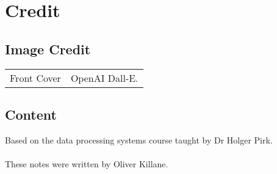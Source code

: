 \chapter{Credit}
\section*{Image Credit}
\begin{center}
	\begin{tabular}{r p{}}
        Front Cover & OpenAI Dall-E. \\
	\end{tabular}
\end{center}

\section*{Content}
Based on the data processing systems course taught by Dr Holger Pirk.
\\
\\ These notes were written by Oliver Killane.
